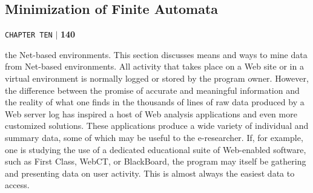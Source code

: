 \documentclass[a4,9pt]{beamer}
\begin{document}
\begin{frame}
\section*{Minimization of Finite Automata}
\begin{flushright}
 \texttt{CHAPTER TEN} \hspace*{0.1cm}\textbf{$|$} \hspace*{0.1cm} \textbf{140}\hspace*{0.1cm}
\end{flushright}
\vspace*{1cm}

the Net-based environments. This section discusses means and ways to mine data from Net-based environments.
All activity that takes place on a Web site or in a virtual environment is normally logged or stored by the program owner. However, the difference between the promise of accurate and meaningful information and the reality of what one finds in the thousands of lines of raw data produced by a Web server log has inspired a host of Web analysis applications and even more customized solutions. These applications produce a wide variety of individual and summary data, some of which may be useful to the e-researcher. If, for example, one is studying the use of a dedicated educational suite of Web-enabled software, such as First Class, WebCT, or BlackBoard, the program may itself be gathering and presenting data on user activity. This is almost always the easiest data to access.
\end{frame}
\end{document}
